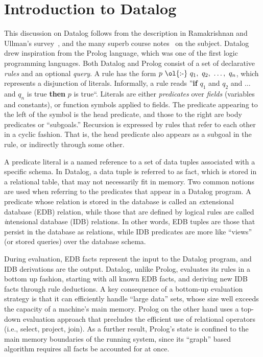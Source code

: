 \section{Introduction to Datalog}
\label{ch:p2:sec:datalog}

This discussion on Datalog follows from the description in Ramakrishnan and
Ullman's survey~\cite{deductive-database}, and the many superb course
notes~\cite{ullmanNotes} on the subject.  Datalog drew inspiration from the
Prolog language, which was one of the first logic programming languages.  Both
Datalog and Prolog consist of a set of declarative {\em rules} and an optional
{\em query}.  A rule has the form $p\ \text{\ol{:-}}\ q_1,\ q_2,\ \ldots,\
q_n$, which represents a disjunction of literals.  Informally, a rule reads
''{\bf if} $q_1$ and $q_2$ and $\ldots$ and $q_n$ is true {\bf then} $p$ is
true``.  Literals are either {\em predicates} over {\em fields} (variables and
constants), or function symbols applied to fields.  The predicate appearing to
the left of the \ol{:-} symbol is the head predicate, and those to the right
are body predicates or ``subgoals.'' Recursion is expressed by rules that refer
to each other in a cyclic fashion.  That is, the head predicate also appears as
a subgoal in the rule, or indirectly through some other.

A predicate literal is a named reference to a set of data tuples associated
with a specific schema.  In Datalog, a data tuple is referred to as fact, which
is stored in a relational table, that may not necessarily fit in memory.  Two
common notions are used when referring to the predicates that appear in a
Datalog program.  A predicate whose relation is stored in the database is
called an {\emph extensional database} (EDB) relation, while those that are
defined by logical rules are called {\emph intensional database} (IDB)
relations.  In other words, EDB tuples are those that persist in the database
as relations, while IDB predicates are more like ``views'' (or stored queries)
over the database schema.

During evaluation, EDB facts represent the input to the Datalog program, and
IDB derivations are the output.  Datalog, unlike Prolog, evaluates its rules in
a bottom up fashion, starting with all known EDB facts, and deriving new IDB
facts through rule deductions.  A key consequence of a bottom-up evaluation
strategy is that it can efficiently handle ``large data'' sets, whose size well
exceeds the capacity of a machine's main memory.  Prolog on the other hand uses
a top-down evaluation approach that precludes the efficient use of relational
operators (i.e., select, project, join).  As a further result, Prolog's state
is confined to the main memory boundaries of the running system, since its
``graph'' based algorithm requires all facts be accounted for at once.

